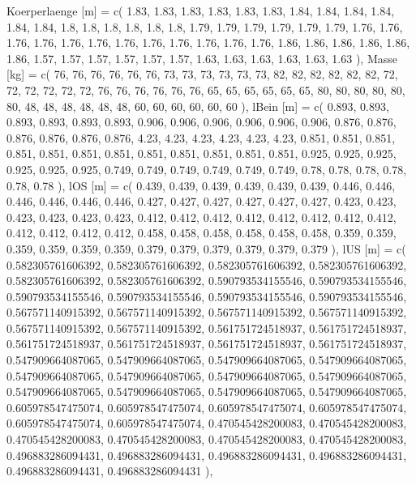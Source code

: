 \documentclass[
  letterpaper,
  DIV=11]{scrartcl}
\newenvironment{Shaded}{\begin{snugshade}}{\end{snugshade}}
\newcommand{\NormalTok}[1]{\textcolor[rgb]{0.00,0.23,0.31}{#1}}
\begin{document}
\begin{Shaded}
\begin{Highlighting}[]
\NormalTok{  \textasciigrave{}Koerperlaenge [m]\textasciigrave{} = c( 1.83, 1.83, 1.83, 1.83, 1.83, 1.83, 1.84, 1.84, 1.84, 1.84, 1.84, 1.84, 1.8, 1.8, 1.8, 1.8, 1.8, 1.8, 1.79, 1.79, 1.79, 1.79, 1.79, 1.79, 1.76, 1.76, 1.76, 1.76, 1.76, 1.76, 1.76, 1.76, 1.76, 1.76, 1.76, 1.76, 1.86, 1.86, 1.86, 1.86, 1.86, 1.86, 1.57, 1.57, 1.57, 1.57, 1.57, 1.57, 1.63, 1.63, 1.63, 1.63, 1.63, 1.63 ),}
\NormalTok{  \textasciigrave{}Masse [kg]\textasciigrave{} = c( 76, 76, 76, 76, 76, 76, 73, 73, 73, 73, 73, 73, 82, 82, 82, 82, 82, 82, 72, 72, 72, 72, 72, 72, 76, 76, 76, 76, 76, 76, 65, 65, 65, 65, 65, 65, 80, 80, 80, 80, 80, 80, 48, 48, 48, 48, 48, 48, 60, 60, 60, 60, 60, 60 ),}
\NormalTok{  \textasciigrave{}lBein [m]\textasciigrave{} = c( 0.893, 0.893, 0.893, 0.893, 0.893, 0.893, 0.906, 0.906, 0.906, 0.906, 0.906, 0.906, 0.876, 0.876, 0.876, 0.876, 0.876, 0.876, 4.23, 4.23, 4.23, 4.23, 4.23, 4.23, 0.851, 0.851, 0.851, 0.851, 0.851, 0.851, 0.851, 0.851, 0.851, 0.851, 0.851, 0.851, 0.925, 0.925, 0.925, 0.925, 0.925, 0.925, 0.749, 0.749, 0.749, 0.749, 0.749, 0.749, 0.78, 0.78, 0.78, 0.78, 0.78, 0.78 ),}
\NormalTok{  \textasciigrave{}lOS [m]\textasciigrave{} = c( 0.439, 0.439, 0.439, 0.439, 0.439, 0.439, 0.446, 0.446, 0.446, 0.446, 0.446, 0.446, 0.427, 0.427, 0.427, 0.427, 0.427, 0.427, 0.423, 0.423, 0.423, 0.423, 0.423, 0.423, 0.412, 0.412, 0.412, 0.412, 0.412, 0.412, 0.412, 0.412, 0.412, 0.412, 0.412, 0.412, 0.458, 0.458, 0.458, 0.458, 0.458, 0.458, 0.359, 0.359, 0.359, 0.359, 0.359, 0.359, 0.379, 0.379, 0.379, 0.379, 0.379, 0.379 ),}
\NormalTok{  \textasciigrave{}lUS [m]\textasciigrave{} = c( 0.582305761606392, 0.582305761606392, 0.582305761606392, 0.582305761606392, 0.582305761606392, 0.582305761606392, 0.590793534155546, 0.590793534155546, 0.590793534155546, 0.590793534155546, 0.590793534155546, 0.590793534155546, 0.567571140915392, 0.567571140915392, 0.567571140915392, 0.567571140915392, 0.567571140915392, 0.567571140915392, 0.561751724518937, 0.561751724518937, 0.561751724518937, 0.561751724518937, 0.561751724518937, 0.561751724518937, 0.547909664087065, 0.547909664087065, 0.547909664087065, 0.547909664087065, 0.547909664087065, 0.547909664087065, 0.547909664087065, 0.547909664087065, 0.547909664087065, 0.547909664087065, 0.547909664087065, 0.547909664087065, 0.605978547475074, 0.605978547475074, 0.605978547475074, 0.605978547475074, 0.605978547475074, 0.605978547475074, 0.470545428200083, 0.470545428200083, 0.470545428200083, 0.470545428200083, 0.470545428200083, 0.470545428200083, 0.496883286094431, 0.496883286094431, 0.496883286094431, 0.496883286094431, 0.496883286094431, 0.496883286094431 ),}

\end{Highlighting}
\end{Shaded}
\end{document}
